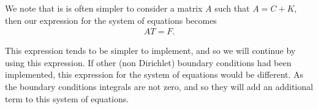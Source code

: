 \documentclass[../fem.tex]{subfiles}
\begin{document}
We note that is is often simpler to consider a matrix $A$ such that $A=C+K$,
then our expression for the system of equations becomes
\begin{align*}
   AT=F.
\end{align*}

This expression tends to be simpler to implement, and so we will continue by
using this expression. If other (non Dirichlet) boundary conditions had been
implemented, this expression for the system of equations would be different. As
the boundary conditions integrals are not zero, and so they will add an
additional term to this system of equations.
\end{document}
